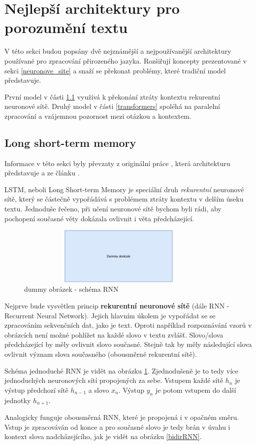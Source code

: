 \section{Nejlepší architektury pro porozumění textu}
V této sekci budou popsány dvě nejznámější a nejpoužívanější architektury používané pro zpracování přirozeného jazyka. Rozšiřují koncepty prezentované v sekci \ref{neuronove_site} a snaží se překonat problémy, které tradiční model představuje.\par
První model v části \ref{lstm} využívá k překonání ztráty kontextu rekurentní neuronové sítě. Druhý model v části \ref{transformers} spoléhá na paralelní zpracování a vzájemnou pozornost mezi otázkou a kontextem.

\subsection{Long short-term memory}
\label{lstm}
Informace v této sekci byly převzaty z originální práce \cite{LSTM}, která architekturu představuje a ze článku \cite{understandingLSTM}.\par
LSTM, neboli Long Short-term Memory je speciální druh \emph{rekurentní} neuronové sítě, který se částečně vypořádává s problémem ztráty kontextu v delším úseku textu. Jednoduše řečeno, při učení neuronové sítě bychom byli rádi, aby pochopení současné věty dokázala ovlivnit i věta předcházející.\par

\begin{figure}[hbt]
	\centering
	\includegraphics[width=4.0in, height=1.1in]{obrazky/dummy_pic.pdf}
	\caption{dummy obrázek - schéma RNN}
	\label{RNN}
\end{figure}

Nejprve bude vysvětlen princip \textbf{rekurentní neuronové sítě} (dále RNN - Recurrent Neural Network).
Jejich hlavním úkolem je vypořádat se se zpracováním sekvenčních dat, jako je text. Oproti například rozpoznávání vzorů v obrázcích není možné pohlížet na každé slovo v textu zvlášť. Slovo/slova předcházející by měly ovlivnit slovo současné. Stejně tak by měly následující slova ovlivnit význam slova současného (obousměrné rekurentní sítě).\par
Schéma jednoduché RNN je vidět na obrázku \ref{RNN}. Zjednodušeně je to tedy více jednoduchých neuronových sítí propojených za sebe. Vstupem každé sítě $h_n$ je výstup předchozí sítě $h_{n-1}$ a slovo $x_n$. Výstup $y_n$ je potom vstupem do další jednotky $h_{n+1}$.\par
Analogicky funguje obousměrná RNN, které je propojená i v opačném směru. Vstup je zpracováván od konce a pro současné slovo je tedy brán v úvahu i kontext slova nadcházejícího, jak je vidět na obrázku \ref{bidirRNN}.\par

